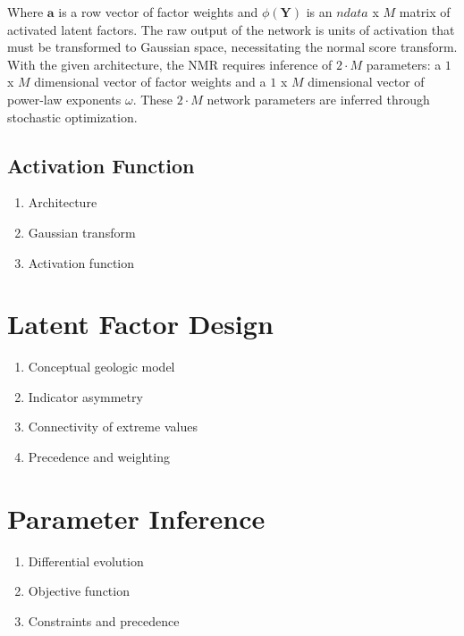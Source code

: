 Where $\mathbf{a}$ is a row vector of factor weights and $\phi\left(\mathbf{Y} \right)$ is an $ndata$ x $M$ matrix of activated latent factors. The raw output of the network is units of activation that must be transformed to Gaussian space, necessitating the normal score transform. With the given architecture, the \gls{NMR} requires inference of $2 \cdot M$ parameters: a $1$ x $M$ dimensional vector of factor weights and a $1$ x $M$ dimensional vector of power-law exponents $\omega$. These $2 \cdot M$ network parameters are inferred through stochastic optimization.

\subsection{Activation Function}
\label{subsec:activation}




\begin{enumerate}[noitemsep]
    \item Architecture
    \item Gaussian transform
    \item Activation function

\end{enumerate}


\FloatBarrier
\section{Latent Factor Design}
\label{sec:factord}

\begin{enumerate}[noitemsep]
    \item Conceptual geologic model
    \item Indicator asymmetry
    \item Connectivity of extreme values
    \item Precedence and weighting
\end{enumerate}


\FloatBarrier
\section{Parameter Inference}
\label{sec:paraminfer}

\begin{enumerate}[noitemsep]
    \item Differential evolution
    \item Objective function
    \item Constraints and precedence

\end{enumerate}


